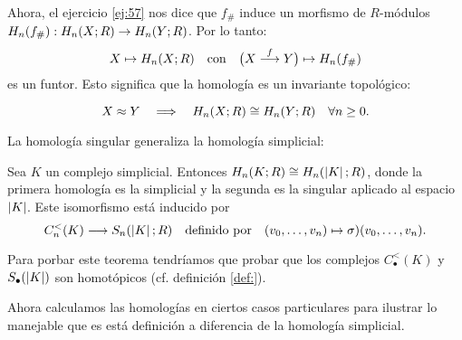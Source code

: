 \documentclass[../../topologia_algebraica]{subfiles}
\begin{document}
Ahora, el ejercicio \ref{ej:57} nos dice que $f_{\#}$ induce un morfismo de $R$-m\'odulos
$H_n(f_{\#}):H_n(X;R)\rightarrow H_n(Y;R)$. Por lo tanto:
\[
  X\mapsto H_n(X;R) \quad\text{con}\quad \big(X\overset{f}{\longrightarrow} Y\big) \mapsto H_n(f_{\#})
\]
es un funtor. Esto significa que la homolog\'ia es un invariante topol\'ogico:

\begin{prop}
  \[
    X\approx Y \quad\Longrightarrow\quad H_n(X;R) \cong H_n(Y;R) \quad\forall n\geq 0.
  \]
\end{prop}

La homolog\'ia singular generaliza la homolog\'ia simplicial:

\begin{thm}
  Sea $K$ un complejo simplicial. Entonces $H_n(K;R)\cong H_n(\left| K \right|;R)$, donde la primera
  homolog\'ia es la simplicial y la segunda es la singular aplicado al espacio $\left| K \right|$.
  Este isomorfismo est\'a inducido por
  \[
    C_n^<(K) \longrightarrow S_n(\left| K \right|;R) \quad\text{definido por}\quad
    (v_0,\ldots,v_n)\mapsto \sigma){(v_0,\ldots,v_n)}.
  \]
\end{thm}

Para porbar este teorema tendr\'iamos que probar que los complejos $C_{\bullet}^<(K)$ y
$S_{\bullet}(\left| K \right|)$ son homot\'opicos (cf. definici\'on \ref{def:}).

Ahora calculamos las homolog\'ias en ciertos casos particulares para ilustrar lo manejable que es est\'a
definici\'on a diferencia de la homolog\'ia simplicial.
\end{document}
